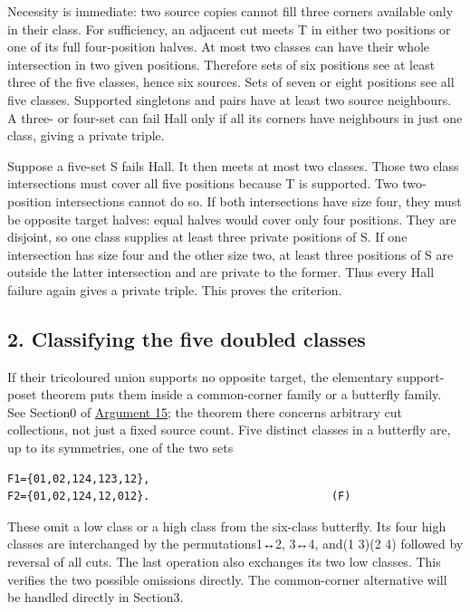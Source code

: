\documentclass[
  10pt,
]{article}
\begin{document}
Necessity is immediate: two source copies cannot fill three corners
available only in their class. For sufficiency, an adjacent cut meets T
in either two positions or one of its full four-position halves. At most
two classes can have their whole intersection in two given positions.
Therefore sets of six positions see at least three of the five classes,
hence six sources. Sets of seven or eight positions see all five
classes. Supported singletons and pairs have at least two source
neighbours. A three- or four-set can fail Hall only if all its corners
have neighbours in just one class, giving a private triple.

Suppose a five-set S fails Hall. It then meets at most two classes.
Those two class intersections must cover all five positions because T is
supported. Two two-position intersections cannot do so. If both
intersections have size four, they must be opposite target halves: equal
halves would cover only four positions. They are disjoint, so one class
supplies at least three private positions of S. If one intersection has
size four and the other size two, at least three positions of S are
outside the latter intersection and are private to the former. Thus
every Hall failure again gives a private triple. This proves the
criterion.

\hypertarget{classifying-the-five-doubled-classes}{%
\subsection*{2. Classifying the five doubled
classes}\label{classifying-the-five-doubled-classes}}

If their tricoloured union supports no opposite target, the elementary
support-poset theorem puts them inside a common-corner family or a
butterfly family. See Section0 of \protect\hyperlink{arg-15}{Argument
15}; the theorem there concerns arbitrary cut collections, not just a
fixed source count. Five distinct classes in a butterfly are, up to its
symmetries, one of the two sets

\begin{verbatim}
F1={01,02,124,123,12},
F2={01,02,124,12,012}.                            (F)
\end{verbatim}

These omit a low class or a high class from the six-class butterfly. Its
four high classes are interchanged by the permutations1↔2, 3↔4, and(1
3)(2 4) followed by reversal of all cuts. The last operation also
exchanges its two low classes. This verifies the two possible omissions
directly. The common-corner alternative will be handled directly in
Section3.
\end{document}
